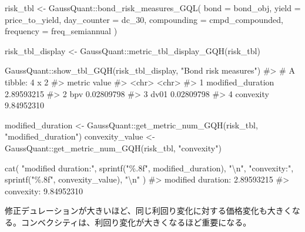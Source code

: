 \documentclass[
  letterpaper,
  DIV=11,
  numbers=noendperiod]{scrreprt}
\newenvironment{Shaded}{\begin{snugshade}}{\end{snugshade}}
\newcommand{\AttributeTok}[1]{\textcolor[rgb]{0.40,0.45,0.13}{#1}}
\newcommand{\CommentTok}[1]{\textcolor[rgb]{0.37,0.37,0.37}{#1}}
\newcommand{\FunctionTok}[1]{\textcolor[rgb]{0.28,0.35,0.67}{#1}}
\newcommand{\NormalTok}[1]{\textcolor[rgb]{0.00,0.23,0.31}{#1}}
\newcommand{\OtherTok}[1]{\textcolor[rgb]{0.00,0.23,0.31}{#1}}
\newcommand{\SpecialCharTok}[1]{\textcolor[rgb]{0.37,0.37,0.37}{#1}}
\newcommand{\StringTok}[1]{\textcolor[rgb]{0.13,0.47,0.30}{#1}}
\begin{document}
\begin{Shaded}
\begin{Highlighting}[]
\NormalTok{risk\_tbl }\OtherTok{\textless{}{-}}\NormalTok{ GaussQuant}\SpecialCharTok{::}\FunctionTok{bond\_risk\_measures\_GQL}\NormalTok{(}
  \AttributeTok{bond =}\NormalTok{ bond\_obj,}
  \AttributeTok{yield =}\NormalTok{ price\_to\_yield,}
  \AttributeTok{day\_counter =}\NormalTok{ dc\_30,}
  \AttributeTok{compounding =}\NormalTok{ cmpd\_compounded,}
  \AttributeTok{frequency =}\NormalTok{ freq\_semiannual}
\NormalTok{)}

\NormalTok{risk\_tbl\_display }\OtherTok{\textless{}{-}}\NormalTok{ GaussQuant}\SpecialCharTok{::}\FunctionTok{metric\_tbl\_display\_GQH}\NormalTok{(risk\_tbl)}

\NormalTok{GaussQuant}\SpecialCharTok{::}\FunctionTok{show\_tbl\_GQH}\NormalTok{(risk\_tbl\_display, }\StringTok{"Bond risk measures"}\NormalTok{)}
\CommentTok{\#\textgreater{} \# A tibble: 4 x 2}
\CommentTok{\#\textgreater{}   metric            value     }
\CommentTok{\#\textgreater{}   \textless{}chr\textgreater{}             \textless{}chr\textgreater{}     }
\CommentTok{\#\textgreater{} 1 modified\_duration 2.89593215}
\CommentTok{\#\textgreater{} 2 bpv               0.02809798}
\CommentTok{\#\textgreater{} 3 dv01              0.02809798}
\CommentTok{\#\textgreater{} 4 convexity         9.84952310}

\NormalTok{modified\_duration }\OtherTok{\textless{}{-}}\NormalTok{ GaussQuant}\SpecialCharTok{::}\FunctionTok{get\_metric\_num\_GQH}\NormalTok{(risk\_tbl, }\StringTok{"modified\_duration"}\NormalTok{)}
\NormalTok{convexity\_value }\OtherTok{\textless{}{-}}\NormalTok{ GaussQuant}\SpecialCharTok{::}\FunctionTok{get\_metric\_num\_GQH}\NormalTok{(risk\_tbl, }\StringTok{"convexity"}\NormalTok{)}

\FunctionTok{cat}\NormalTok{(}
  \StringTok{"modified duration:"}\NormalTok{,}
  \FunctionTok{sprintf}\NormalTok{(}\StringTok{"\%.8f"}\NormalTok{, modified\_duration),}
  \StringTok{"}\SpecialCharTok{\textbackslash{}n}\StringTok{"}\NormalTok{,}
  \StringTok{"convexity:"}\NormalTok{,}
  \FunctionTok{sprintf}\NormalTok{(}\StringTok{"\%.8f"}\NormalTok{, convexity\_value),}
  \StringTok{"}\SpecialCharTok{\textbackslash{}n}\StringTok{"}
\NormalTok{)}
\CommentTok{\#\textgreater{} modified duration: 2.89593215 }
\CommentTok{\#\textgreater{}  convexity: 9.84952310}
\end{Highlighting}
\end{Shaded}

修正デュレーションが大きいほど、同じ利回り変化に対する価格変化も大きくなる。コンベクシティは、利回り変化が大きくなるほど重要になる。
\end{document}
